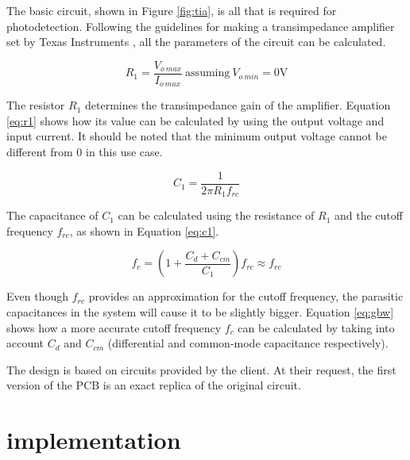 The basic circuit, shown in Figure \ref{fig:tia}, is all that is required for photodetection. Following the guidelines for making a transimpedance amplifier set by Texas Instruments \cite{semig24}, all the parameters of the circuit can be calculated.

\begin{equation}\label{eq:r1}
	R_1 = \frac{V_{o\ max}}{I_{o\ max}}\ \text{assuming}\ V_{o\ min} = 0 \unit{\volt}
\end{equation}

The resistor $R_1$ determines the transimpedance gain of the amplifier. Equation \ref{eq:r1} shows how its value can be calculated by using the output voltage and input current. It should be noted that the minimum output voltage cannot be different from 0 in this use case.

\begin{equation}\label{eq:c1}
	C_1 = \frac{1}{2 \pi R_1 f_{rc}}
\end{equation}

The capacitance of $C_1$ can be calculated using the resistance of $R_1$ and the cutoff frequency $f_{rc}$, as shown in Equation \ref{eq:c1}. 

\begin{equation}\label{eq:gbw}
	f_{c} = (1 + \frac{C_d + C_{cm}}{C_1})f_{rc} \approx f_{rc}
\end{equation}

Even though $f_{rc}$ provides an approximation for the cutoff frequency, the parasitic capacitances in the system will cause it to be slightly bigger. Equation \ref{eq:gbw} shows how a more accurate cutoff frequency $f_c$ can be calculated by taking into account $C_d$ and $C_{cm}$ (differential and common-mode capacitance respectively).

The design is based on circuits provided by the client. At their request, the first version of the PCB is an exact replica of the original circuit.  

\section{ implementation}
